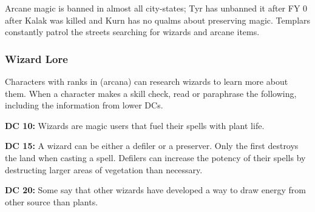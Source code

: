 Arcane magic is banned in almost all city-states; Tyr has unbanned it after FY 0 after Kalak was killed and Kurn has no qualms about preserving magic. Templars constantly patrol the streets searching for wizards and arcane items.

\subsubsection{Wizard Lore}

Characters with ranks in  (arcana) can research wizards to learn more about them. When a character makes a skill check, read or paraphrase the following, including the information from lower DCs.

\textbf{DC 10:} Wizards are magic users that fuel their spells with plant life.

\textbf{DC 15:} A wizard can be either a defiler or a preserver. Only the first destroys the land when casting a spell. Defilers can increase the potency of their spells by destructing larger areas of vegetation than necessary.

\textbf{DC 20:} Some say that other wizards have developed a way to draw energy from other source than plants.